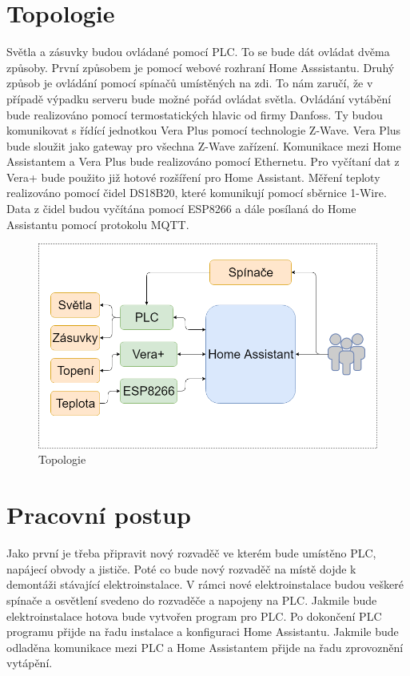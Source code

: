 \documentclass[a4paper,12pt,czech,bibliography=totoc]{scrbook}
\begin{document}
\section{Topologie}
	Světla a zásuvky budou ovládané pomocí PLC. To se bude dát ovládat dvěma způsoby. První způsobem je pomocí webové rozhraní Home Asssistantu. Druhý způsob je ovládání pomocí spínačů umístěných na zdi. To nám zaručí, že v případě výpadku serveru bude možné pořád ovládat světla.
	\newline
	 Ovládání vytábění bude realizováno pomocí termostatických hlavic od firmy Danfoss. Ty budou komunikovat s řídící jednotkou Vera Plus pomocí technologie Z-Wave. Vera Plus bude sloužit jako gateway pro všechna Z-Wave zařízení. Komunikace mezi Home Assistantem a Vera Plus bude realizováno pomocí Ethernetu. Pro vyčítaní dat z Vera+ bude použito již hotové rozšíření pro Home Assistant.
	 \newline
	   Měření teploty realizováno pomocí čidel DS18B20, které komunikují pomocí sběrnice 1-Wire. Data z čidel budou vyčítána pomocí ESP8266 a dále posílaná do Home Assistantu pomocí protokolu MQTT.
\begin{figure}[h]
	\centering
	\includegraphics[scale = 0.5]{topologie.PNG}
	\caption{Topologie}
	\label{fig:my_label}
\end{figure}
\section{Pracovní postup}
Jako první je třeba připravit nový rozvaděč ve kterém bude umístěno PLC, napájecí obvody a jističe. Poté co bude nový rozvaděč na místě dojde k demontáži stávající elektroinstalace. V rámci nové elektroinstalace budou veškeré spínače a osvětlení svedeno do rozvaděče a napojeny na PLC. Jakmile bude elektroinstalace hotova bude vytvořen program pro PLC. Po dokončení PLC programu přijde na řadu instalace a konfiguraci Home Assistantu. Jakmile bude odladěna komunikace mezi PLC a Home Assistantem přijde na řadu zprovoznění vytápění.   
\end{document}
